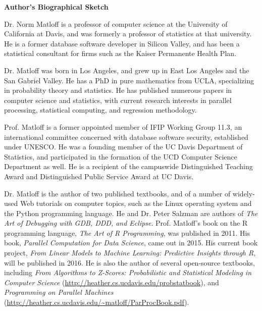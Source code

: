 \begin{center}
{\bf Author's Biographical Sketch}
\end{center}

Dr. Norm Matloff is a professor of computer science at the University of
California at Davis, and was formerly a professor of statistics at that
university. He is a former database software developer in Silicon
Valley, and has been a statistical consultant for firms such as the
Kaiser Permanente Health Plan.

Dr. Matloff was born in Los Angeles, and grew up in East Los Angeles and
the San Gabriel Valley. He has a PhD in pure mathematics from UCLA,
specializing in probability theory and statistics.  He has published
numerous papers in computer science and statistics, with current
research interests in parallel processing, statistical computing,
and regression methodology.

Prof. Matloff is a former appointed member of IFIP Working Group 11.3,
an international committee concerned with database software security,
established under UNESCO.  He was a founding member of the UC Davis
Department of Statistics, and participated in the formation of the UCD
Computer Science Department as well.  He is a recipient of the
campuswide Distinguished Teaching Award and Distinguished Public Service
Award at UC Davis.

Dr. Matloff is the author of two published textbooks, and of a number of
widely-used Web tutorials on computer topics, such as the Linux
operating system and the Python programming language.  He and Dr. Peter
Salzman are authors of {\it The Art of Debugging with GDB, DDD, and
Eclipse}. Prof.  Matloff's book on the R programming language, {\it The
Art of R Programming}, was published in 2011.  His book, {\it Parallel
Computation for Data Science}, came out in 2015.  His current book
project, {\it From Linear Models to Machine Learning: Predictive
Insights through R}, will be published in 2016.  He is also the author
of several open-source textbooks, including {\it From Algorithms to
Z-Scores: Probabilistic and Statistical Modeling in Computer Science}
(\url{http://heather.cs.ucdavis.edu/probstatbook}), and {\it Programming
on Parallel Machines}
(\url{http://heather.cs.ucdavis.edu/~matloff/ParProcBook.pdf}).
